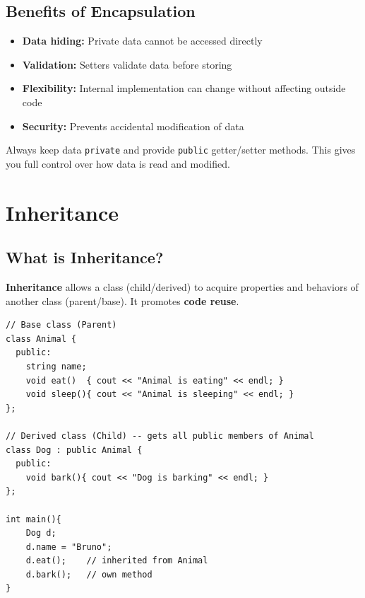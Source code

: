 \documentclass[12pt,a4paper]{report}
\begin{document}
\section{Benefits of Encapsulation}

\begin{itemize}[leftmargin=*]
  \item \textbf{Data hiding:} Private data cannot be accessed directly
  \item \textbf{Validation:} Setters validate data before storing
  \item \textbf{Flexibility:} Internal implementation can change without affecting outside code
  \item \textbf{Security:} Prevents accidental modification of data
\end{itemize}

\begin{tipbox}
Always keep data \texttt{private} and provide \texttt{public} getter/setter methods.
This gives you full control over how data is read and modified.
\end{tipbox}

\chapter{Inheritance}

\section{What is Inheritance?}

\textbf{Inheritance} allows a class (child/derived) to acquire properties and behaviors of another class (parent/base). It promotes \textbf{code reuse}.

\begin{lstlisting}[caption={Basic Inheritance}]
// Base class (Parent)
class Animal {
  public:
    string name;
    void eat()  { cout << "Animal is eating" << endl; }
    void sleep(){ cout << "Animal is sleeping" << endl; }
};

// Derived class (Child) -- gets all public members of Animal
class Dog : public Animal {
  public:
    void bark(){ cout << "Dog is barking" << endl; }
};

int main(){
    Dog d;
    d.name = "Bruno";
    d.eat();    // inherited from Animal
    d.bark();   // own method
}
\end{lstlisting}
\end{document}

